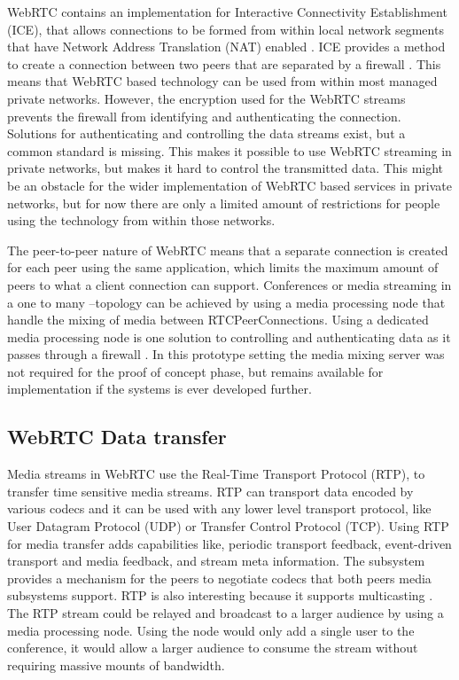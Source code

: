 \documentclass[english,12pt,a4paper,pdftex]{article}
\begin{document}
WebRTC contains an implementation for Interactive Connectivity Establishment (ICE), that allows connections to be formed from within local network segments that have Network Address Translation (NAT) enabled \cite{Jennings, Johnston}. ICE provides a method to create a connection between two peers that are separated by a firewall \cite{Rosenberg}. This means that WebRTC based technology can be used from within most managed private networks. However, the encryption used for the WebRTC streams prevents the firewall from identifying and authenticating the connection. Solutions for authenticating and controlling the data streams exist, but a common standard is missing. This makes it possible to use WebRTC streaming in private networks, but makes it hard to control the transmitted data. \cite{Johnston} This might be an obstacle for the wider implementation of WebRTC based services in private networks, but for now there are only a limited amount of restrictions for people using the technology from within those networks.

The peer-to-peer nature of WebRTC means that a separate connection is created for each peer using the same application, which limits the maximum amount of peers to what a client connection can support. Conferences or media streaming in a one to many --topology can be achieved by using a media processing node that handle the mixing of media between RTCPeerConnections. \cite{Jennings} Using a dedicated media processing node is one solution to controlling and authenticating data as it passes through a firewall \cite{Johnston}. In this prototype setting the media mixing server was not required for the proof of concept phase, but remains available for implementation if the systems is ever developed further. 

\subsection{WebRTC Data transfer}

Media streams in WebRTC use the Real-Time Transport Protocol (RTP), to transfer time sensitive media streams. RTP can transport data encoded by various codecs and it can be used with any lower level transport protocol, like User Datagram Protocol (UDP) or Transfer Control Protocol (TCP). Using RTP for media transfer adds capabilities like, periodic transport feedback, event-driven transport and media feedback, and stream meta information. The subsystem provides a mechanism for the peers to negotiate codecs that both peers media subsystems support. \cite{Jennings, Johnston, Frederick} RTP is also interesting because it supports multicasting \cite{Frederick}. The RTP stream could be relayed and broadcast to a larger audience by using a media processing node. Using the node would only add a single user to the conference, it would allow a larger audience to consume the stream without requiring massive mounts of bandwidth.
\end{document}
